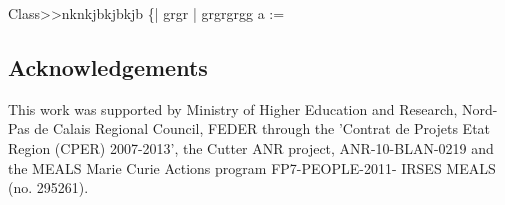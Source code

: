 \documentclass{article}
\begin{document}
\begin{code}{}
Class>>nknkjbkjbkjb
    \{| grgr | 
    grgrgrgg 
    a := 
\end{code}


%

\subsection*{Acknowledgements} This work was supported by Ministry of Higher Education and Research, Nord-Pas de Calais Regional Council, FEDER through the 'Contrat de
Projets Etat Region (CPER) 2007-2013',  the Cutter ANR project, ANR-10-BLAN-0219 and the MEALS Marie Curie Actions program FP7-PEOPLE-2011-
IRSES MEALS (no. 295261). 

% 
% 

% 



\end{document}
